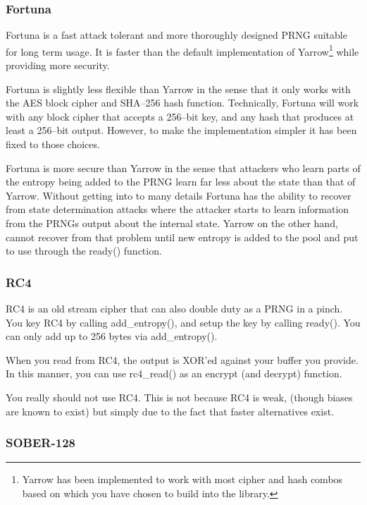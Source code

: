 \documentclass[synpaper]{book}
\begin{document}
\subsubsection{Fortuna}

Fortuna is a fast attack tolerant and more thoroughly designed PRNG suitable for long term
usage.  It is faster than the default implementation of Yarrow\footnote{Yarrow has been implemented
to work with most cipher and hash combos based on which you have chosen to build into the library.} while
providing more security.

Fortuna is slightly less flexible than Yarrow in the sense that it only works with the AES block cipher
and SHA--256 hash function.  Technically, Fortuna will work with any block cipher that accepts a 256--bit
key, and any hash that produces at least a 256--bit output.  However, to make the implementation simpler
it has been fixed to those choices.

Fortuna is more secure than Yarrow in the sense that attackers who learn parts of the entropy being
added to the PRNG learn far less about the state than that of Yarrow.  Without getting into to many
details Fortuna has the ability to recover from state determination attacks where the attacker starts
to learn information from the PRNGs output about the internal state.  Yarrow on the other hand, cannot
recover from that problem until new entropy is added to the pool and put to use through the ready() function.

\subsubsection{RC4}

RC4 is an old stream cipher that can also double duty as a PRNG in a pinch.  You key RC4 by
calling add\_entropy(), and setup the key by calling ready().  You can only add up to 256 bytes via
add\_entropy().

When you read from RC4, the output is XOR'ed against your buffer you provide.  In this manner, you can use rc4\_read()
as an encrypt (and decrypt) function.

You really should not use RC4.  This is not because RC4 is weak, (though biases are known to exist) but simply due to
the fact that faster alternatives exist.

\subsubsection{SOBER-128}
\end{document}
